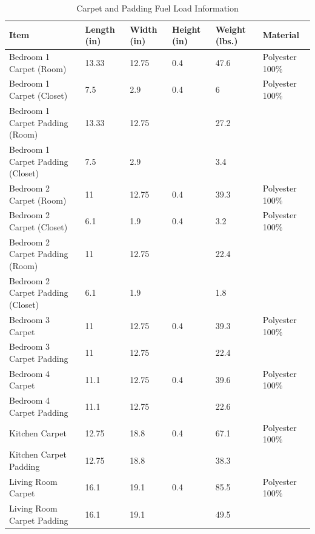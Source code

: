 \begin{table}[H]
\centering
\begin{tabular}{|L{0.23\textwidth}|C{0.08\textwidth}|C{0.08\textwidth}|C{0.08\textwidth}|C{0.08\textwidth}|L{0.25\textwidth}|}
\hline
Item 								&Length (in) 	&Width (in) 	&Height (in) 	&Weight (lbs.) 	&Material \\ \hline \hline
Bedroom 1 Carpet (Room) 			&13.33			&12.75			&0.4			&47.6			&Polyester 100\% \\ \hline
Bedroom 1 Carpet (Closet)			&7.5			&2.9			&0.4			&6				&Polyester 100\% \\ \hline
Bedroom 1 Carpet Padding (Room)		&13.33			&12.75			&				&27.2			& \\ \hline
Bedroom 1 Carpet Padding (Closet)	&7.5			&2.9			&				&3.4			& \\ \hline	 	 
Bedroom 2 Carpet (Room) 			&11				&12.75			&0.4			&39.3			&Polyester 100\% \\ \hline
Bedroom 2 Carpet (Closet)			&6.1			&1.9			&0.4			&3.2			&Polyester 100\% \\ \hline
Bedroom 2 Carpet Padding (Room)		&11				&12.75			&				&22.4			& \\ \hline
Bedroom 2 Carpet Padding (Closet)	&6.1			&1.9			&				&1.8			& \\ \hline	  
Bedroom 3 Carpet 					&11				&12.75			&0.4			&39.3			&Polyester 100\% \\ \hline
Bedroom 3 Carpet Padding 			&11				&12.75			&				&22.4			& \\ \hline	 
Bedroom 4 Carpet 					&11.1			&12.75			&0.4			&39.6			&Polyester 100\% \\ \hline
Bedroom 4 Carpet Padding 			&11.1			&12.75			&				&22.6			& \\ \hline	 
Kitchen Carpet 						&12.75			&18.8			&0.4			&67.1			&Polyester 100\% \\ \hline
Kitchen Carpet Padding 				&12.75			&18.8			&				&38.3			& \\ \hline	 
Living Room Carpet					&16.1			&19.1			&0.4			&85.5			&Polyester 100\% \\ \hline 
Living Room Carpet Padding 			&16.1			&19.1			&				&49.5			& \\ \hline	
\end{tabular}
\caption{Carpet and Padding Fuel Load Information}
\label{table:carpet_padding_fuel_weights}
\end{table}

